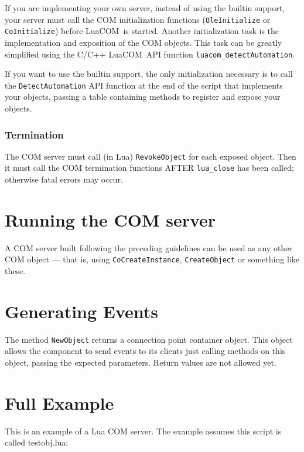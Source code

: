 \documentclass[11pt,a4paper,english]{report}
\newcommand{\techname}[1]{\mbox{#1}}
\newcommand{\luacom}{\techname{LuaCOM}}
\begin{document}
If you are implementing your own server, instead of using the builtin support, your server
must call the COM initialization functions (\texttt{OleInitialize} or \texttt{CoInitialize}) before \luacom\ is
started. Another initialization task is the implementation and
exposition of the COM objects. This task can be greatly simplified
using the C/C++ \luacom\ API function \verb+luacom_detectAutomation+.

If you want to use the builtin support, the only initialization necessary is to call
the \verb+DetectAutomation+ API function at the end of the script that implements your objects,
passing a table containing methods to register and expose your objects.

\subsubsection*{Termination}
The COM server must call (in Lua) \verb+RevokeObject+ for each
exposed object. Then it must call the COM termination functions AFTER
\verb+lua_close+ has been called; otherwise fatal errors may occur.



\section{Running the COM server}

A COM server built following the preceding guidelines can be used
as any other COM object --- that is, using \verb+CoCreateInstance+,
\verb+CreateObject+ or something like these.



\section{Generating Events}

The method \verb+NewObject+ returns a connection point container
object. This object allows the component to send events to its clients
just calling methods on this object, passing the expected
parameters. Return values are not allowed yet.

\section{Full Example}

This is an example of a Lua COM server. The example assumes this script is called testobj.lua:
\end{document}
